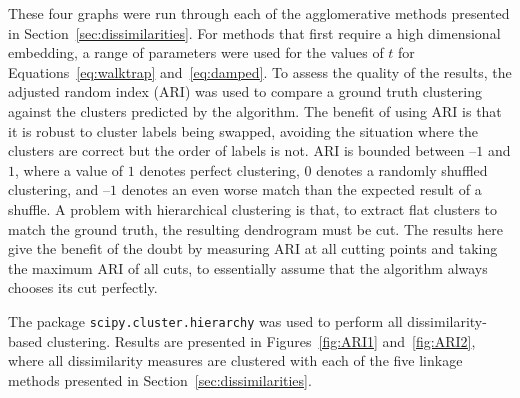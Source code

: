 These four graphs were run through each of the agglomerative methods presented in Section~\ref{sec:dissimilarities}. For methods that first require a high dimensional embedding, a range of parameters were used for the values of $t$ for Equations~\eqref{eq:walktrap} and~\eqref{eq:damped}.
To assess the quality of the results, the adjusted random index (ARI) was used to compare a ground truth clustering against the clusters predicted by the algorithm. The benefit of using ARI is that it is robust to cluster labels being swapped, avoiding the situation where the clusters are correct but the order of labels is not.
ARI is bounded between --$1$ and $1$, where a value of $1$ denotes perfect clustering, $0$ denotes a randomly shuffled clustering, and --$1$ denotes an even worse match than the expected result of a shuffle.
A problem with hierarchical clustering is that, to extract flat clusters to match the ground truth, the resulting dendrogram must be cut. The results here give the benefit of the doubt by measuring ARI at all cutting points and taking the maximum ARI of all cuts, to essentially assume that the algorithm always chooses its cut perfectly.

The package \texttt{scipy.cluster.hierarchy} \cite{Virtanen2020} was used to perform all dissimilarity-based clustering.
Results are presented in Figures~\ref{fig:ARI1} and~\ref{fig:ARI2}, where all dissimilarity measures are clustered with each of the five linkage methods presented in Section~\ref{sec:dissimilarities}.

